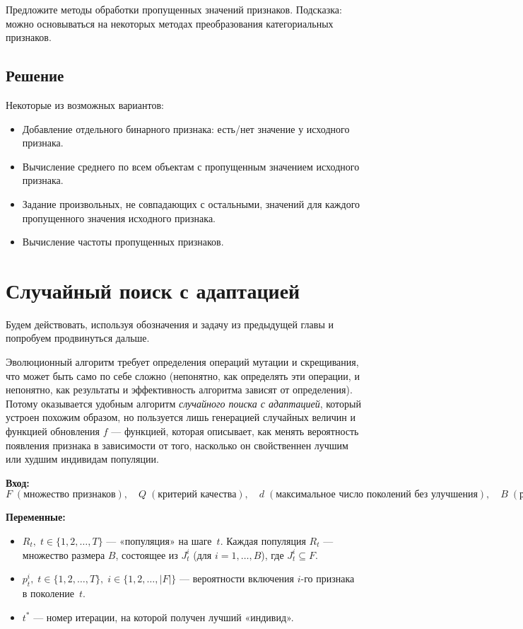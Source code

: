 Предложите методы обработки пропущенных значений признаков.
Подсказка: можно основываться на некоторых методах преобразования категориальных признаков.

\subsection*{Решение}

Некоторые из возможных вариантов:
\begin{itemize}
    \item Добавление отдельного бинарного признака: есть/нет значение у исходного признака.
    \item Вычисление среднего по всем объектам с пропущенным значением исходного признака.
    \item Задание произвольных, не совпадающих с остальными, значений для каждого пропущенного значения исходного признака.
    \item Вычисление частоты пропущенных признаков.
\end{itemize}





\section*{Случайный поиск с адаптацией}
Будем действовать, используя обозначения и задачу из предыдущей главы и попробуем продвинуться дальше.

Эволюционный алгоритм требует определения операций мутации и скрещивания, что может быть само по себе сложно (непонятно, как определять эти операции, и непонятно, как результаты и эффективность алгоритма зависят от определения). Потому оказывается удобным алгоритм \textit{случайного поиска с адаптацией}, который устроен похожим образом, но пользуется лишь генерацией случайных величин и функцией обновления $f$ --- функцией, которая описывает, как менять вероятность появления признака в зависимости от того, насколько он свойственнен лучшим или худшим индивидам популяции.

\noindent
\textbf{Вход:}
\[
    F \;(\text{множество признаков}),
    \quad Q\;(\text{критерий качества}),
    \quad d\;(\text{максимальное число поколений без улучшения}),
    \quad B\;(\text{размер ``популяции'' на каждом шаге}),
    \quad T\;(\text{общее число поколений}).
\]

\noindent
\textbf{Переменные:}
\begin{itemize}
    \item $R_t,\; t \in \{1, 2, \ldots, T\}$ — «популяция» на шаге~$t$. Каждая популяция $R_t$ — множество размера $B$, состоящее из $J_t^i$ (для $i=1,\dots,B$), где $J_t^i \subseteq F$.
    \item $p_t^i,\; t \in \{1, 2, \ldots, T\},\; i \in \{1, 2, \ldots, |F|\}$ — вероятности включения $i$-го признака в поколение~$t$.
    \item $t^*$ — номер итерации, на которой получен лучший «индивид».
\end{itemize}

